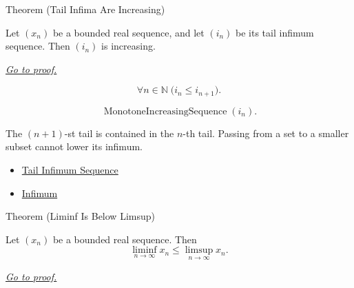 \begin{theorembox}{Theorem (Tail Infima Are Increasing)}
\begin{theorem}
\label{thm:tail-infima-are-increasing}
Let $(x_n)$ be a bounded real sequence, and let $(i_n)$ be its tail
infimum sequence. Then $(i_n)$ is increasing.

\smallskip
\noindent
\hyperref[prf:tail-infima-are-increasing]{\textit{Go to proof.}}
\end{theorem}
\end{theorembox}

\begin{remark*}
\[
\forall n\in\mathbb{N}\;\bigl(i_n\le i_{n+1}\bigr).
\]
\end{remark*}

\begin{remark*}
\[
\operatorname{MonotoneIncreasingSequence}(i_n).
\]
\end{remark*}

\begin{remark*}[Interpretation]
The $(n+1)$-st tail is contained in the $n$-th tail. Passing from a set to a
smaller subset cannot lower its infimum.
\end{remark*}

\begin{dependencies}
\begin{itemize}
  \item \hyperref[def:tail-infimum-sequence]{Tail Infimum Sequence}
  \item \hyperref[def:infimum]{Infimum}
\end{itemize}
\end{dependencies}


\begin{theorembox}{Theorem (Liminf Is Below Limsup)}
\begin{theorem}
\label{thm:liminf-below-limsup}
Let $(x_n)$ be a bounded real sequence. Then
\[
  \liminf_{n\to\infty}x_n\le \limsup_{n\to\infty}x_n.
\]

\smallskip
\noindent
\hyperref[prf:liminf-below-limsup]{\textit{Go to proof.}}
\end{theorem}
\end{theorembox}

